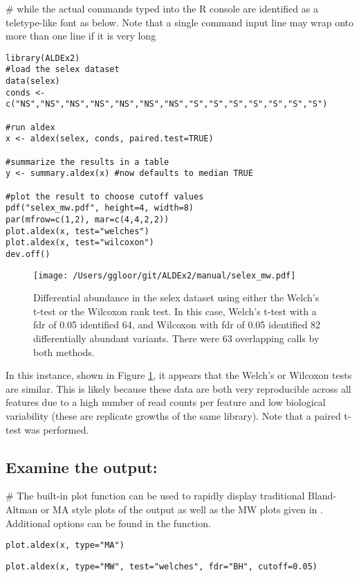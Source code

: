 \documentclass[11pt]{amsart}
\begin{document}
\noindent \# while the actual commands typed into the R console are identified as a teletype-like font as below. Note that a single command input line may wrap onto more than one line if it is very long\\

\begin{verbatim}
library(ALDEx2)
#load the selex dataset
data(selex)
conds <- c("NS","NS","NS","NS","NS","NS","NS","S","S","S","S","S","S","S")

#run aldex
x <- aldex(selex, conds, paired.test=TRUE)

#summarize the results in a table
y <- summary.aldex(x) #now defaults to median TRUE

#plot the result to choose cutoff values
pdf("selex_mw.pdf", height=4, width=8)
par(mfrow=c(1,2), mar=c(4,4,2,2))
plot.aldex(x, test="welches")
plot.aldex(x, test="wilcoxon")
dev.off()
\end{verbatim}
\begin{figure}[!h]
\begin{center}
\texttt{[image: /Users/ggloor/git/ALDEx2/manual/selex\_mw.pdf]}
\caption{Differential abundance in the selex dataset using either the Welch's t-test or the Wilcoxon rank test. In this case, Welch's t-test with a fdr of 0.05 identified 64, and Wilcoxon with fdr of 0.05 identified 82 differentially abundant variants. There were 63 overlapping calls by both methods. }
\label{selex}
\end{center}
\end{figure}

\vspace{12pt}
In this instance,  shown in Figure \ref{selex}, it appears that the Welch's or Wilcoxon tests  are similar. This is likely because these data are both very reproducible across all features due to a high number of read counts per feature and low biological variability (these are replicate growths of the same library). Note that a paired t-test was performed.

\subsection*{Examine the output:}
\noindent\#  The built-in plot function can be used to rapidly display traditional Bland-Altman or MA style plots of the output as well as the MW plots given in \cite{fernandes:2013}. Additional options can be found in the function.\\
\noindent\begin{verbatim}plot.aldex(x, type="MA")\end{verbatim}
\noindent\begin{verbatim}plot.aldex(x, type="MW", test="welches", fdr="BH", cutoff=0.05)\end{verbatim}
\end{document}
